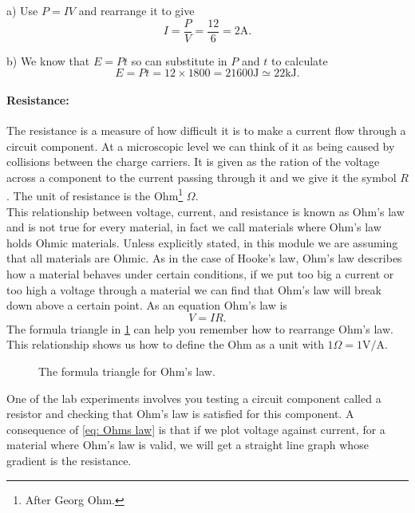 a) Use $P=IV$ and rearrange it to give
\begin{equation*}
I=\frac{P}{V}=\frac{12}{6}=2\text{A}.
\end{equation*}

b) We know that $E=Pt$ so can substitute in $P$ and $t$ to calculate
\begin{equation*}
E=Pt=12\times 1800=21600\text{J}\simeq 22\text{kJ}.
\end{equation*}


\paragraph{Resistance:} The resistance is a measure of how difficult it is to make a current flow through a circuit component. At a microscopic level we can think of it as being caused by collisions between the charge carriers. It is given as the ration of the voltage across a component to the current passing through it and we give it the symbol $R$. The unit of resistance is the Ohm\footnote{After Georg Ohm.} $\Omega$.\\

This relationship between voltage, current, and resistance is known as Ohm's law and is not true for every material, in fact we call materials where Ohm's law holds Ohmic materials. Unless explicitly stated, in this module we are assuming that all materials are Ohmic. As in the case of Hooke's law, Ohm's law describes how a material behaves under certain conditions, if we put too big a current or too high a voltage through a material we can find that Ohm's law will break down above a certain point. As an equation Ohm's law is
\begin{equation}
V=IR.
\label{eq: Ohms law}
\end{equation}
The formula triangle in \cref{fig: Ohms law} can help you remember how to rearrange Ohm's law. This relationship shows us how to define the Ohm as a unit with $1\Omega=1\text{V/A}$.

\begin{figure}[ht]
    \centering
   \large {}
    \caption{The formula triangle for Ohm's law. }
    \label{fig: Ohms law}
\end{figure}

One of the lab experiments involves you testing a circuit component called a resistor and checking that Ohm's law is satisfied for this component. A consequence of \cref{eq: Ohms law} is that if we plot voltage against current, for a material where Ohm's law is valid, we will get a straight line graph whose gradient is the resistance.

